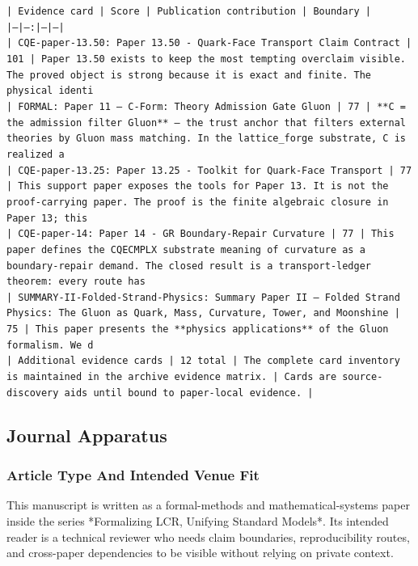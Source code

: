\documentclass[11pt]{article}
\begin{document}
\noindent\texttt{| Evidence card | Score | Publication contribution | Boundary |}\\
\noindent\texttt{|---|---:|---|---|}\\
\noindent\texttt{| CQE-paper-13.50: Paper 13.50 - Quark-Face Transport Claim Contract | 101 | Paper 13.50 exists to keep the most tempting overclaim visible. The proved object is strong because it is exact and finite. The physical identi}\\
\noindent\texttt{| FORMAL: Paper 11 — C-Form: Theory Admission Gate Gluon | 77 | **C = the admission filter Gluon** — the trust anchor that filters external theories by Gluon mass matching. In the lattice\_forge substrate, C is realized a}\\
\noindent\texttt{| CQE-paper-13.25: Paper 13.25 - Toolkit for Quark-Face Transport | 77 | This support paper exposes the tools for Paper 13. It is not the proof-carrying paper. The proof is the finite algebraic closure in Paper 13; this }\\
\noindent\texttt{| CQE-paper-14: Paper 14 - GR Boundary-Repair Curvature | 77 | This paper defines the CQECMPLX substrate meaning of curvature as a boundary-repair demand. The closed result is a transport-ledger theorem: every route has }\\
\noindent\texttt{| SUMMARY-II-Folded-Strand-Physics: Summary Paper II — Folded Strand Physics: The Gluon as Quark, Mass, Curvature, Tower, and Moonshine | 75 | This paper presents the **physics applications** of the Gluon formalism. We d}\\
\noindent\texttt{| Additional evidence cards | 12 total | The complete card inventory is maintained in the archive evidence matrix. | Cards are source-discovery aids until bound to paper-local evidence. |}\\

\subsection*{Journal Apparatus}

\subsubsection*{Article Type And Intended Venue Fit}

This manuscript is written as a formal-methods and mathematical-systems paper
inside the series *Formalizing LCR, Unifying Standard Models*. Its intended
reader is a technical reviewer who needs claim boundaries, reproducibility
routes, and cross-paper dependencies to be visible without relying on private
context.
\end{document}
